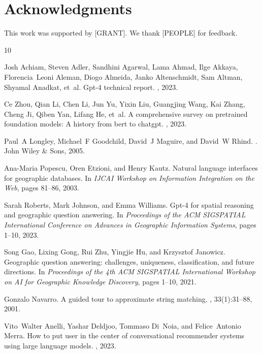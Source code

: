 \documentclass[sigconf]{acmart}
\begin{document}
\section*{Acknowledgments}
This work was supported by [GRANT]. We thank [PEOPLE] for feedback.



\begin{thebibliography}{10}

Josh Achiam, Steven Adler, Sandhini Agarwal, Lama Ahmad, Ilge Akkaya, Florencia~Leoni Aleman, Diogo Almeida, Janko Altenschmidt, Sam Altman, Shyamal Anadkat, et~al.
\newblock Gpt-4 technical report.
, 2023.

Ce Zhou, Qian Li, Chen Li, Jun Yu, Yixin Liu, Guangjing Wang, Kai Zhang, Cheng Ji, Qiben Yan, Lifang He, et~al.
\newblock A comprehensive survey on pretrained foundation models: A history from bert to chatgpt.
, 2023.

Paul~A Longley, Michael~F Goodchild, David~J Maguire, and David~W Rhind.
.
\newblock John Wiley \& Sons, 2005.

Ana-Maria Popescu, Oren Etzioni, and Henry Kautz.
\newblock Natural language interfaces for geographic databases.
\newblock In {\em IJCAI Workshop on Information Integration on the Web}, pages 81--86, 2003.

Sarah Roberts, Mark Johnson, and Emma Williams.
\newblock Gpt-4 for spatial reasoning and geographic question answering.
\newblock In {\em Proceedings of the ACM SIGSPATIAL International Conference on Advances in Geographic Information Systems}, pages 1--10, 2023.

Song Gao, Lixing Gong, Rui Zhu, Yingjie Hu, and Krzysztof Janowicz.
\newblock Geographic question answering: challenges, uniqueness, classification, and future directions.
\newblock In {\em Proceedings of the 4th ACM SIGSPATIAL International Workshop on AI for Geographic Knowledge Discovery}, pages 1--10, 2021.

Gonzalo Navarro.
\newblock A guided tour to approximate string matching.
, 33(1):31--88, 2001.

Vito~Walter Anelli, Yashar Deldjoo, Tommaso Di~Noia, and Felice~Antonio Merra.
\newblock How to put user in the center of conversational recommender systems using large language models.
, 2023.


\end{thebibliography}
\end{document}
